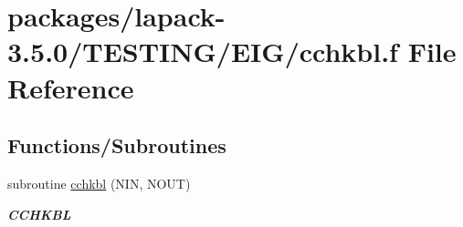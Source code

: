 \hypertarget{cchkbl_8f}{}\section{packages/lapack-\/3.5.0/\+T\+E\+S\+T\+I\+N\+G/\+E\+I\+G/cchkbl.f File Reference}
\label{cchkbl_8f}
\subsection*{Functions/\+Subroutines}
\begin{DoxyCompactItemize}
\item 
subroutine \hyperlink{group__complex__eig_ga0c6abf11ff426c1ca494ccdce417484e}{cchkbl} (N\+I\+N, N\+O\+U\+T)
\begin{DoxyCompactList}\small\item\em {\bfseries C\+C\+H\+K\+B\+L} \end{DoxyCompactList}\end{DoxyCompactItemize}
